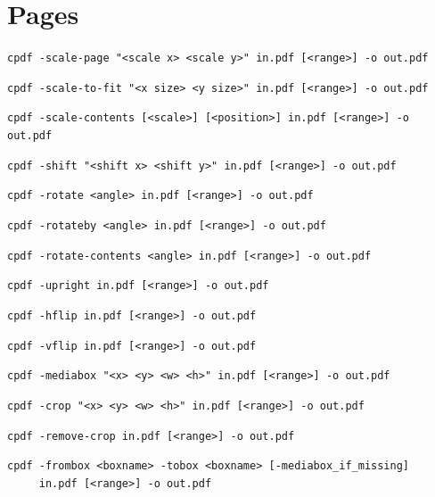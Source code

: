 \documentclass[a4paper,makeidx]{memoir}
\begin{document}
\chapter{Pages}
  \label{pages}
  \begin{framed}
  \small\noindent\verb!cpdf -scale-page "<scale x> <scale y>" in.pdf [<range>] -o out.pdf!
   
  \vspace{1.5mm}
  \small\noindent\verb!cpdf -scale-to-fit "<x size> <y size>" in.pdf [<range>] -o out.pdf!


  \vspace{1.5mm}
  \small\noindent\verb!cpdf -scale-contents [<scale>] [<position>] in.pdf [<range>] -o out.pdf!
  
  \vspace{1.5mm}
  \small\noindent\verb!cpdf -shift "<shift x> <shift y>" in.pdf [<range>] -o out.pdf!

  \vspace{1.5mm}
  \small\noindent\verb!cpdf -rotate <angle> in.pdf [<range>] -o out.pdf!

  \vspace{1.5mm}
  \small\noindent\verb!cpdf -rotateby <angle> in.pdf [<range>] -o out.pdf!

  \vspace{1.5mm}
  \small\noindent\verb!cpdf -rotate-contents <angle> in.pdf [<range>] -o out.pdf!

  \vspace{1.5mm}
  \small\noindent\verb!cpdf -upright in.pdf [<range>] -o out.pdf!

  \vspace{1.5mm}
  \small\noindent\verb!cpdf -hflip in.pdf [<range>] -o out.pdf!

  \vspace{1.5mm}
  \small\noindent\verb!cpdf -vflip in.pdf [<range>] -o out.pdf!
  
  \vspace{1.5mm}
  \small\noindent\verb!cpdf -mediabox "<x> <y> <w> <h>" in.pdf [<range>] -o out.pdf!


  \vspace{1.5mm}
  \small\noindent\verb!cpdf -crop "<x> <y> <w> <h>" in.pdf [<range>] -o out.pdf!

  \vspace{1.5mm}
  \small\noindent\verb!cpdf -remove-crop in.pdf [<range>] -o out.pdf!


  \vspace{1.5mm}
  \small\noindent\verb!cpdf -frombox <boxname> -tobox <boxname> [-mediabox_if_missing]! \\
  \noindent\verb!     in.pdf [<range>] -o out.pdf!
  \end{framed}
\end{document}
